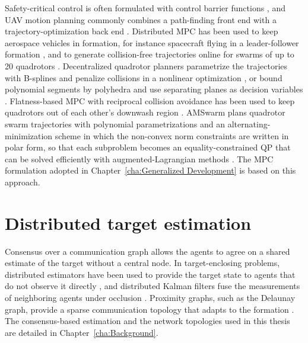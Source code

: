 Safety-critical control is often formulated with control barrier functions \cite{amesControlBarrierFunction2017b}, and \gls{UAV} motion planning commonly combines a path-finding front end with a trajectory-optimization back end \cite{quanSurveyUAVMotion2020}. Distributed \gls{MPC} has been used to keep aerospace vehicles in formation, for instance spacecraft flying in a leader-follower formation \cite{pereira2023}, and to generate collision-free trajectories online for swarms of up to 20 quadrotors \cite{luis2020}. Decentralized quadrotor planners parametrize the trajectories with B-splines and penalize collisions in a nonlinear optimization \cite{zhou2021ego}, or bound polynomial segments by polyhedra and use separating planes as decision variables \cite{tordesillas2022}. Flatness-based \gls{MPC} with reciprocal collision avoidance has been used to keep quadrotors out of each other's downwash region \cite{arul2020}. AMSwarm \cite{10161063} plans quadrotor swarm trajectories with polynomial parametrizations and an alternating-minimization scheme in which the non-convex norm constraints are written in polar form, so that each subproblem becomes an equality-constrained \gls{QP} that can be solved efficiently with augmented-Lagrangian methods \cite{boydDistributedOptimizationStatistical2011}. The \gls{MPC} formulation adopted in Chapter~\ref{cha:Generalized Development} is based on this approach.

\section{Distributed target estimation} \label{sec.2:Distributed estimation}

Consensus over a communication graph \cite{olfati-saberConsensusCooperationNetworked2007} allows the agents to agree on a shared estimate of the target without a central node. In target-enclosing problems, distributed estimators have been used to provide the target state to agents that do not observe it directly \cite{huang2025}, and distributed Kalman filters fuse the measurements of neighboring agents under occlusion \cite{liu2025enclose,liu2025circ}. Proximity graphs, such as the Delaunay graph, provide a sparse communication topology that adapts to the formation \cite{cortesRobustRendezvousMobile2006,10.1145/2491288.2491296}. The consensus-based estimation and the network topologies used in this thesis are detailed in Chapter~\ref{cha:Background}.

